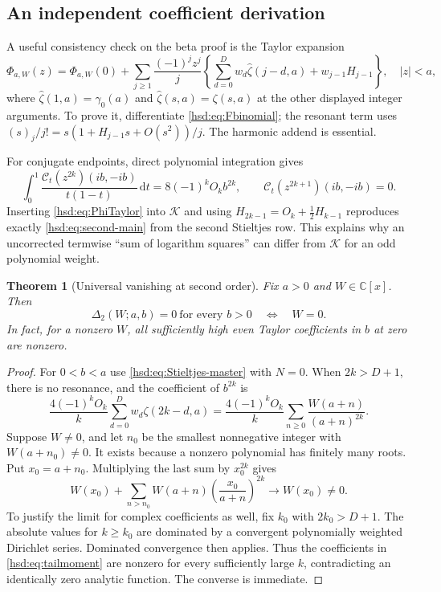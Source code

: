 \documentclass[11pt]{article}
\numberwithin{equation}{section}
\newtheorem{theorem}{Theorem}[section]
\theoremstyle{definition}\newtheorem{definition}[theorem]{Definition}
\theoremstyle{remark}\newtheorem{remark}[theorem]{Remark}
\newcommand{\dd}{\,\mathrm d}
\newcommand{\C}{\mathbb C}
\newcommand{\CC}{\mathcal C}
\newcommand{\KK}{\mathcal K}
\begin{document}
\subsection{An independent coefficient derivation}
A useful consistency check on the beta proof is the Taylor expansion
\begin{equation}\label{hsd:eq:PhiTaylor}
 \Phi_{a,W}(z)=\Phi_{a,W}(0)+\sum_{j\ge1}\frac{(-1)^jz^j}{j}
 \left\{\sum_{d=0}^D w_d\widehat\zeta(j-d,a)+w_{j-1}H_{j-1}\right\},
 \quad |z|<a,
\end{equation}
where $\widehat\zeta(1,a)=\gamma_0(a)$ and
$\widehat\zeta(s,a)=\zeta(s,a)$ at the other displayed integer arguments.
To prove it, differentiate \eqref{hsd:eq:Fbinomial}; the resonant term
uses $(s)_j/j!=s(1+H_{j-1}s+O(s^2))/j$.
The harmonic addend is essential.

For conjugate endpoints, direct polynomial integration gives
\[
 \int_0^1\frac{\CC_t(z^{2k})(ib,-ib)}{t(1-t)}\dd t
                    =8(-1)^kO_kb^{2k},
 \qquad \CC_t(z^{2k+1})(ib,-ib)=0.
\]
Inserting \eqref{hsd:eq:PhiTaylor} into $\KK$ and using
$H_{2k-1}=O_k+\tfrac12H_{k-1}$ reproduces exactly
\eqref{hsd:eq:second-main} from the second Stieltjes row.
This explains why an uncorrected termwise ``sum of logarithm squares''
can differ from $\KK$ for an odd polynomial weight.

\begin{theorem}[Universal vanishing at second order]\label{hsd:thm:nonvanishing}
Fix $a>0$ and $W\in\C[x]$. Then
\begin{equation}\label{hsd:eq:zero-classification}
 \Delta_2(W;a,b)=0\ \text{for every }b>0
 \quad\Longleftrightarrow\quad W=0.
\end{equation}
In fact, for a nonzero $W$, all sufficiently high even Taylor
coefficients in $b$ at zero are nonzero.
\end{theorem}
\begin{proof}
For $0<b<a$ use \eqref{hsd:eq:Stieltjes-master} with $N=0$.
When $2k>D+1$, there is no resonance, and the coefficient of $b^{2k}$ is
\begin{equation}\label{hsd:eq:tailmoment}
 \frac{4(-1)^kO_k}{k}\sum_{d=0}^D w_d\zeta(2k-d,a)
 =\frac{4(-1)^kO_k}{k}\sum_{n\ge0}\frac{W(a+n)}{(a+n)^{2k}}.
\end{equation}
Suppose $W\ne0$, and let $n_0$ be the smallest nonnegative integer with
$W(a+n_0)\ne0$. It exists because a nonzero polynomial has finitely many
roots. Put $x_0=a+n_0$. Multiplying the last sum by $x_0^{2k}$ gives
\[
 W(x_0)+\sum_{n>n_0}W(a+n)\left(\frac{x_0}{a+n}\right)^{2k}
                         \longrightarrow W(x_0)\ne0.
\]
To justify the limit for complex coefficients as well, fix $k_0$ with
$2k_0>D+1$. The absolute values for $k\ge k_0$ are dominated by a
convergent polynomially weighted Dirichlet series. Dominated convergence
then applies. Thus the coefficients in \eqref{hsd:eq:tailmoment} are
nonzero for every sufficiently large $k$, contradicting an identically
zero analytic function. The converse is immediate.
\end{proof}
\end{document}
